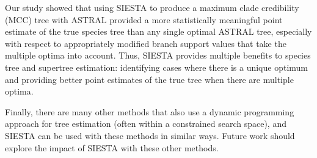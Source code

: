Our study showed that using SIESTA to produce a maximum clade credibility (MCC) tree with ASTRAL provided a  more statistically meaningful point estimate of the true species tree than any single optimal ASTRAL tree, especially with respect to appropriately modified branch support values that take the multiple optima into account.
Thus, SIESTA provides multiple benefits to species tree and supertree estimation: identifying cases where there is a unique optimum and providing better point estimates of the true tree when there are multiple optima.

Finally, there are many other methods  that also use a dynamic programming approach for tree estimation (often within a constrained search space), and SIESTA can be used with these methods in similar ways. Future work should explore the impact of SIESTA with these other methods. 


